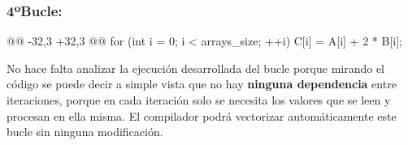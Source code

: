 \subsubsection{\textbf{4ºBucle:}}
\begin{listing}[firstnumber=31]
    @@ -32,3 +32,3 @@
    for (int i = 0; i < arrays_size; ++i) {
      C[i] = A[i] + 2 * B[i];
    }
\end{listing}
\par No hace falta analizar la ejecución desarrollada del bucle porque mirando el código se puede decir a simple vista que no hay
\textbf{ninguna dependencia} entre iteraciones, porque en cada iteración solo se necesita los valores que se leen y procesan en ella misma.
El compilador podrá vectorizar automáticamente este bucle sin ninguna modificación.